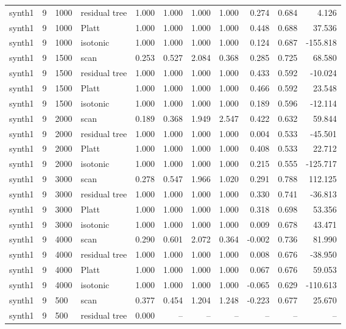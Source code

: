 \begin{tabular}{lrllrrrrrrr}
synth1 & 9 & 1000 & residual tree & 1.000 & 1.000 & 1.000 & 1.000 & 0.274 & 0.684 & 4.126 \\
synth1 & 9 & 1000 & Platt & 1.000 & 1.000 & 1.000 & 1.000 & 0.448 & 0.688 & 37.536 \\
synth1 & 9 & 1000 & isotonic & 1.000 & 1.000 & 1.000 & 1.000 & 0.124 & 0.687 & -155.818 \\
synth1 & 9 & 1500 & scan & 0.253 & 0.527 & 2.084 & 0.368 & 0.285 & 0.725 & 68.580 \\
synth1 & 9 & 1500 & residual tree & 1.000 & 1.000 & 1.000 & 1.000 & 0.433 & 0.592 & -10.024 \\
synth1 & 9 & 1500 & Platt & 1.000 & 1.000 & 1.000 & 1.000 & 0.466 & 0.592 & 23.548 \\
synth1 & 9 & 1500 & isotonic & 1.000 & 1.000 & 1.000 & 1.000 & 0.189 & 0.596 & -12.114 \\
synth1 & 9 & 2000 & scan & 0.189 & 0.368 & 1.949 & 2.547 & 0.422 & 0.632 & 59.844 \\
synth1 & 9 & 2000 & residual tree & 1.000 & 1.000 & 1.000 & 1.000 & 0.004 & 0.533 & -45.501 \\
synth1 & 9 & 2000 & Platt & 1.000 & 1.000 & 1.000 & 1.000 & 0.408 & 0.533 & 22.712 \\
synth1 & 9 & 2000 & isotonic & 1.000 & 1.000 & 1.000 & 1.000 & 0.215 & 0.555 & -125.717 \\
synth1 & 9 & 3000 & scan & 0.278 & 0.547 & 1.966 & 1.020 & 0.291 & 0.788 & 112.125 \\
synth1 & 9 & 3000 & residual tree & 1.000 & 1.000 & 1.000 & 1.000 & 0.330 & 0.741 & -36.813 \\
synth1 & 9 & 3000 & Platt & 1.000 & 1.000 & 1.000 & 1.000 & 0.318 & 0.698 & 53.356 \\
synth1 & 9 & 3000 & isotonic & 1.000 & 1.000 & 1.000 & 1.000 & 0.009 & 0.678 & 43.471 \\
synth1 & 9 & 4000 & scan & 0.290 & 0.601 & 2.072 & 0.364 & -0.002 & 0.736 & 81.990 \\
synth1 & 9 & 4000 & residual tree & 1.000 & 1.000 & 1.000 & 1.000 & 0.008 & 0.676 & -38.950 \\
synth1 & 9 & 4000 & Platt & 1.000 & 1.000 & 1.000 & 1.000 & 0.067 & 0.676 & 59.053 \\
synth1 & 9 & 4000 & isotonic & 1.000 & 1.000 & 1.000 & 1.000 & -0.065 & 0.629 & -110.613 \\
synth1 & 9 & 500 & scan & 0.377 & 0.454 & 1.204 & 1.248 & -0.223 & 0.677 & 25.670 \\
synth1 & 9 & 500 & residual tree & 0.000 & -- & -- & -- & -- & -- & -- \\

\end{tabular}
